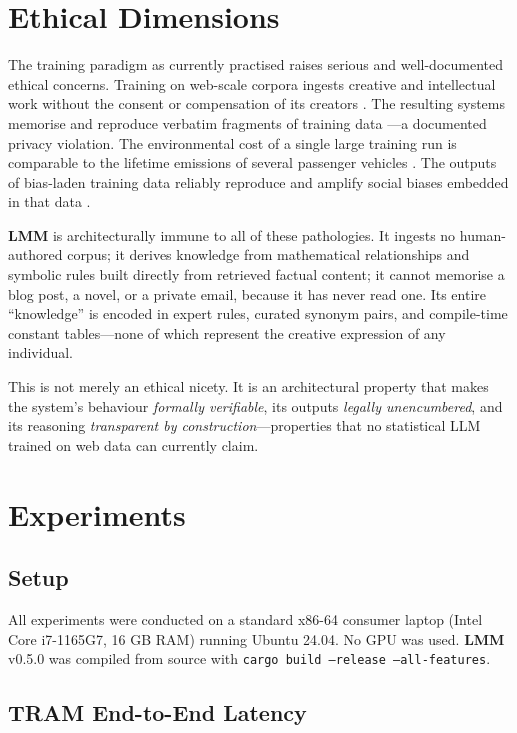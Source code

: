 \documentclass[11pt,a4paper]{article}
\newcommand{\lmm}{\texorpdfstring{%
  \textbf{\color{lmmAccent}LMM}}{LMM}}
\begin{document}
\section{Ethical Dimensions}
\label{sec:ethics}

The training paradigm as currently practised raises serious and well-documented ethical
concerns. Training on web-scale corpora ingests creative and intellectual work without the
consent or compensation of its creators \citep{grynbaum2023nyt,COPYRIGHT_AI_REPORT_2025}.
The resulting systems memorise and reproduce verbatim fragments of training data
\citep{ippolito2022}---a documented privacy violation. The environmental cost of a single
large training run is comparable to the lifetime emissions of several passenger vehicles
\citep{strubell2019energy}. The outputs of bias-laden training data reliably reproduce and
amplify social biases embedded in that data \citep{gallegos2023bias}.

\lmm{} is architecturally immune to all of these pathologies. It ingests no human-authored
corpus; it derives knowledge from mathematical relationships and symbolic rules built directly
from retrieved factual content; it cannot memorise a blog post, a novel, or a private email,
because it has never read one. Its entire ``knowledge'' is encoded in expert rules, curated
synonym pairs, and compile-time constant tables---none of which represent the creative
expression of any individual.

This is not merely an ethical nicety. It is an architectural property that makes the system's
behaviour \emph{formally verifiable}, its outputs \emph{legally unencumbered}, and its
reasoning \emph{transparent by construction}---properties that no statistical LLM trained on
web data can currently claim.

\section{Experiments}
\label{sec:experiments}

\subsection{Setup}

All experiments were conducted on a standard x86-64 consumer laptop (Intel Core i7-1165G7,
16 GB RAM) running Ubuntu 24.04. No GPU was used. \lmm{} v0.5.0 was compiled from source
with \texttt{cargo build --release --all-features}.

\subsection{TRAM End-to-End Latency}
\end{document}
